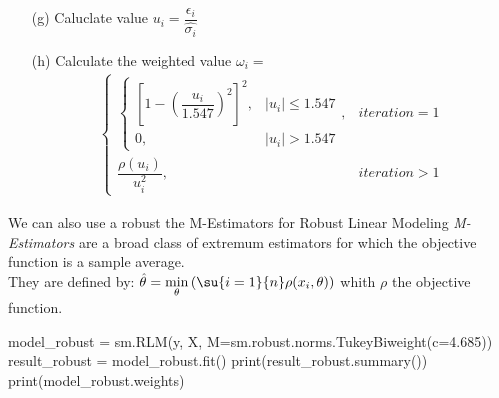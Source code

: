 \begin{enumerate}
\begin{enumerate}
			\item[(g)] Caluclate value $u_{i}=\dfrac{\epsilon_{i}}{\hat{\sigma_{i}}}$
			\item[(h)] Calculate the weighted value $\omega_{i}=$
				\begin{align*}
				\begin{cases}
					\begin{cases}
						\left[1-\left(\dfrac{u_{i}}{1.547}\right)^{2}
						\right]^{2},&|u_{i}|\leq 1.547\\
						0, &|u_{i}|>1.547
					\end{cases},&iteration = 1\\
					\dfrac{\rho(u_{i})}{u_{i}^{2}},&iteration>1
				\end{cases}
				\end{align*}
		\end{enumerate}
	


\end{enumerate}

We can also use a robust the M-Estimators for Robust Linear Modeling
\emph{M-Estimators} are a broad class of extremum estimators for which the objective function is
a sample average.\\
They are defined by: 
$\hat{\theta} = \min\limits_{\theta}\left(\su{{i=1}}{n}\rho(x_{i},\theta)\right)$
whith $\rho$ the objective function.
\begin{python}
model_robust = sm.RLM(y, X, M=sm.robust.norms.TukeyBiweight(c=4.685))
result_robust = model_robust.fit()
print(result_robust.summary())
print(model_robust.weights)
\end{python}



